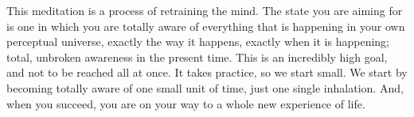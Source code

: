 This meditation is a process of retraining the mind. The state you are aiming
for is one in which you are totally aware of everything that is happening in
your own perceptual universe, exactly the way it happens, exactly when it is
happening; total, unbroken awareness in the present time. This is an incredibly
high goal, and not to be reached all at once. It takes practice, so we start
small. We start by becoming totally aware of one small unit of time, just one
single inhalation. And, when you succeed, you are on your way to a whole new
experience of life.